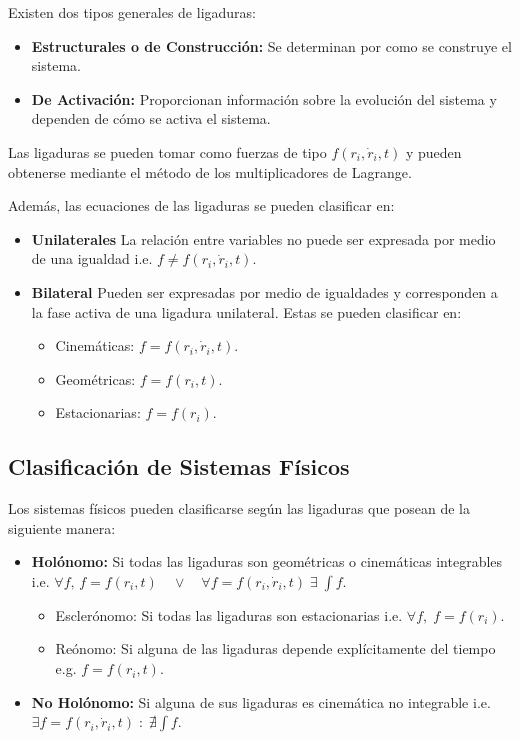 \documentclass{article}
\theoremstyle{definition}
\begin{document}
Existen dos tipos generales de ligaduras:

\begin{itemize}
	\item \textbf{Estructurales o de Construcción:} Se determinan por como se construye el sistema.
	\item \textbf{De Activación:} Proporcionan información sobre la evolución del sistema y dependen de cómo se activa el sistema.
\end{itemize}

Las ligaduras se pueden tomar como fuerzas de tipo $f(r_i, \dot{r}_i, t)$ y pueden obtenerse mediante el método de los multiplicadores de Lagrange.

Además, las ecuaciones de las ligaduras se pueden clasificar en:

\begin{itemize}
	\item \textbf{Unilaterales} La relación entre variables no puede ser expresada por medio de una igualdad i.e. $f \ne f(r_i, \dot{r}_i, t)$.
	\item \textbf{Bilateral} Pueden ser expresadas por medio de igualdades y corresponden a la fase activa de una ligadura unilateral. Estas se pueden clasificar en:
		\begin{itemize}
			\item Cinemáticas: $f = f(r_i, \dot{r}_i, t)$.
			\item Geométricas: $f = f(r_i, t)$.
			\item Estacionarias: $f = f(r_i)$.
		\end{itemize}
\end{itemize}

\subsection{Clasificación de Sistemas Físicos}
Los sistemas físicos pueden clasificarse según las ligaduras que posean de la siguiente manera:

\begin{itemize}
	\item \textbf{Holónomo:} Si todas las ligaduras son geométricas o cinemáticas integrables i.e. $\forall f, \, f = f(r_i, t) \quad \lor \quad \forall f = f(r_i, \dot{r}_i, t) \; \exists \; \int f$.
		\begin{itemize}
			\item Esclerónomo: Si todas las ligaduras son estacionarias i.e. $\forall f, \; f = f(r_i)$.
			\item Reónomo: Si alguna de las ligaduras depende explícitamente del tiempo e.g. $f = f(r_i, t)$.
		\end{itemize}
	\item \textbf{No Holónomo:} Si alguna de sus ligaduras es cinemática no integrable i.e. $\exists f = f(r_i, \dot{r}_i, t) \; : \; \nexists \int f$.
\end{itemize}
\end{document}

